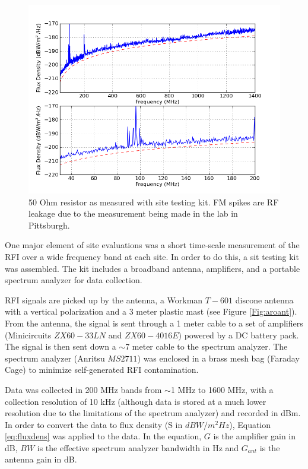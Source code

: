 \begin{figure}[htb]
\begin{center}
\includegraphics[width=0.9\linewidth]{RFI_testing/figures/50Ohm_cal.png}
\caption{50 Ohm resistor as measured with site testing kit. FM spikes are RF leakage due to the measurement being made in the lab in Pittsburgh.}
\label{Fig:resflux}
\end{center}
\end{figure}

One major element of site evaluations was a short time-scale measurement of the RFI over a wide frequency band at each site. In order to do this, a sit testing kit was assembled. The kit includes a broadband antenna, amplifiers, and a portable spectrum analyzer for data collection. 

RFI signals are picked up by the antenna, a Workman $T-601$ discone antenna with a vertical polarization and a 3 meter plastic mast (see Figure \ref{Fig:aroant}). From the antenna, the signal is sent through a 1 meter cable to a set of amplifiers (Minicircuits $ZX60-33LN$ and $ZX60-4016E$) powered by a DC battery pack. The signal is then sent down a $\sim$7 meter cable to the spectrum analyzer. The spectrum analyzer (Anritsu $MS2711$) was enclosed in a brass mesh bag (Faraday Cage) to minimize self-generated RFI contamination. 

Data was collected in 200 MHz bands from $\sim$1 MHz to 1600 MHz, with a collection resolution of 10 kHz (although data is stored at a much lower resolution due to the limitations of the spectrum analyzer) and recorded in dBm. In order to convert the data to flux density (S in $dBW/m^2Hz$), Equation \ref{eq:fluxdens} was applied to the data. In the equation, $G$ is the amplifier gain in dB, $BW$ is the effective spectrum analyzer bandwidth in Hz and $G_{ant}$ is the antenna gain in dB. 

